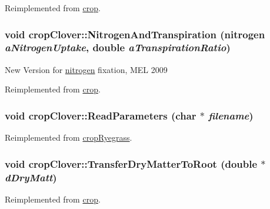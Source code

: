 Reimplemented from \hyperlink{classcrop_aec045be7b4c6fd112b48ead6ee68dcd9}{crop}.\hypertarget{classcrop_clover_a93d5dff1cdb5018b42f38cac6dc1de13}{
\subsubsection[{NitrogenAndTranspiration}]{\setlength{\rightskip}{0pt plus 5cm}void cropClover::NitrogenAndTranspiration ({\bf nitrogen} {\em aNitrogenUptake}, \/  double {\em aTranspirationRatio})}}
\label{classcrop_clover_a93d5dff1cdb5018b42f38cac6dc1de13}
New Version for \hyperlink{classnitrogen}{nitrogen} fixation, MEL 2009 

Reimplemented from \hyperlink{classcrop_a4ed6aaf98890015fb52d4d8957313166}{crop}.\hypertarget{classcrop_clover_a3a424244e4f17a802bbf8b52effdbd14}{
\subsubsection[{ReadParameters}]{\setlength{\rightskip}{0pt plus 5cm}void cropClover::ReadParameters (char $\ast$ {\em filename})}}
\label{classcrop_clover_a3a424244e4f17a802bbf8b52effdbd14}


Reimplemented from \hyperlink{classcrop_ryegrass_a0bcd3f5b23b82810d40e2bf089755447}{cropRyegrass}.\hypertarget{classcrop_clover_a1440530239e8b4754faefd889e56c83a}{
\subsubsection[{TransferDryMatterToRoot}]{\setlength{\rightskip}{0pt plus 5cm}void cropClover::TransferDryMatterToRoot (double $\ast$ {\em dDryMatt})}}
\label{classcrop_clover_a1440530239e8b4754faefd889e56c83a}


Reimplemented from \hyperlink{classcrop_aeb0993f2a6d2f21d30a5c24bbd46833e}{crop}.

